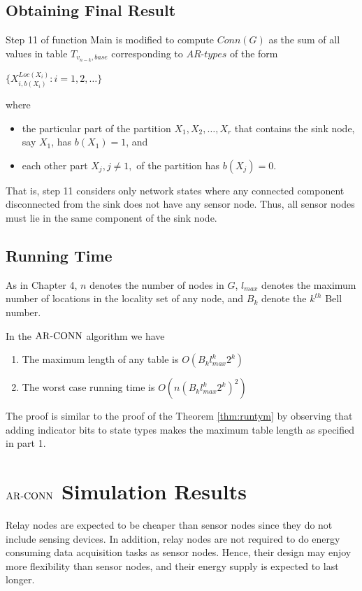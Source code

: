 \subsection{Obtaining Final Result}
\label{subsec:ofr}
Step 11 of function Main is modified to compute $Conn(G)$ as the sum of all values in table $T_{v_{n-k},base}$ corresponding to $AR\mbox{-}types$ of the form\\
\nwline
\centerline{
$\{X_{i,b(X_i)}^{Loc(X_i)} : i=1,2, \ldots\}$}
where
\begin{itemize}[noitemsep]
\item the particular part of the partition ${X_1,X_2,\ldots,X_r}$ that contains the sink node, say $X_1$, has $b(X_1)=1$, and 
\item each other part $X_j, j \neq 1,$ of the partition has $b(X_j)=0$.
\end{itemize}
That is, step 11 considers only network states where any connected component disconnected from the sink does not have any sensor node. Thus, all sensor nodes must lie in the same component of the sink node.

\subsection{Running Time}
\label{subsec:rt}

As in Chapter 4, $n$ denotes the number of nodes in $G$, $l_{max}$ denotes the maximum number of locations in the locality set of any node, and $B_k$ denote the $k^{th}$ Bell number.
\begin{theorem}\normalfont In the ${\mathrm {AR\mbox{-}CONN}}$ algorithm we have\label{thm:rt}
\begin{enumerate}[noitemsep]
\item The maximum length of any table is $O(B_kl_{max}^k2^k)$ 
\item The worst case running time is $O(n(B_kl_{max}^k2^k)^2)$
\end{enumerate}
\end{theorem}


The proof is similar to the proof of the Theorem \ref{thm:runtym} by observing that adding indicator bits to state types makes the maximum table length as specified in part 1.
\section{${\mathrm {AR\mbox{-}CONN}}$ Simulation Results}
\label{sec:arconnsim}
Relay nodes are expected to be cheaper than sensor nodes since they do not include sensing devices. In addition, relay nodes are not required to do energy consuming data acquisition tasks as sensor nodes. Hence, their design may enjoy more flexibility than sensor nodes, and their energy supply is expected to last longer.

